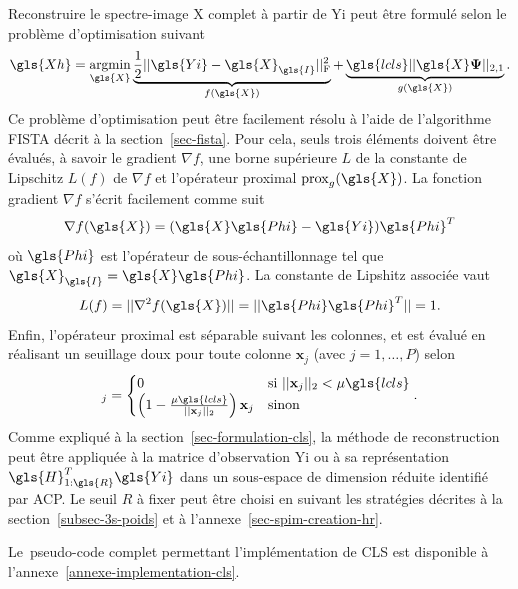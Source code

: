 Reconstruire le spectre-image \gls{X} complet à partir de \gls{Yi} peut être formulé selon le problème d'optimisation suivant
\begin{equation}
\gls{Xh}=\argmin_{\gls{X}} 
    \underbrace{\frac{1}{2} \frobnorm{\gls{Yi} - \gls{X}_{\gls{I}}}}_{f(\gls{X})} +
    \underbrace{ \gls{lcls} ||\gls{X}\boldsymbol\Psi||_{2, 1}}_{g(\gls{X})}.
\end{equation}
Ce problème d'optimisation peut être facilement résolu à l'aide de l'algorithme FISTA décrit à la section~\ref{sec-fista}. Pour cela, seuls trois éléments doivent être évalués, à savoir le gradient $\nabla f$, une borne supérieure $L$ de la constante de Lipschitz $L(f)$ de $\nabla f$ et l'opérateur proximal  $\mathrm{prox}_{g}(\gls{X})$. La fonction gradient $\nabla f$ s'écrit facilement comme suit
\begin{equation}
    \nabla f(\gls{X}) = (\gls{X}\gls{Phi} - \gls{Yi})\gls{Phi}^T
\end{equation}
où $\gls{Phi}$ est l'opérateur de sous-échantillonnage tel que $\gls{X}_{\gls{I}} = \gls{X}\gls{Phi}$. La constante de Lipshitz associée vaut
\begin{equation}
    L(f) = ||\nabla^2 f(\gls{X})|| = ||\gls{Phi}\gls{Phi}^T|| = 1.
\end{equation}
Enfin, l'opérateur proximal est séparable suivant les colonnes, et est évalué en réalisant un seuillage doux pour toute colonne $\mathbf{x}_j$ (avec $j=1, \dots, P$) selon~\cite{jenatton2011proximal}
\begin{equation}
[\mathrm{prox}_{\mu g}(\gls{X})]_j = 
\begin{cases}
0&\text{si}\ ||\mathbf{x}_j||_2 < \mu \gls{lcls}\\
\left(1-\frac{\mu\gls{lcls}}{||\mathbf{x}_j||_2}\right)\mathbf{x}_j&\text{sinon}\\
\end{cases}.\label{eq-prox-op}
\end{equation}
Comme expliqué à la section~\ref{sec-formulation-cls}, la méthode de reconstruction peut être appliquée à la matrice d'observation \gls{Yi} ou à sa représentation $\gls{H}_{1:\gls{R}}^T\gls{Yi}$ dans un sous-espace de dimension réduite identifié par ACP. Le seuil $R$ à fixer peut être choisi en suivant les stratégies décrites à la section~\ref{subsec-3s-poids} et à l'annexe~\ref{sec-spim-creation-hr}.

Le pseudo-code complet permettant l'implémentation de CLS est disponible à l'annexe~\ref{annexe-implementation-cls}.

